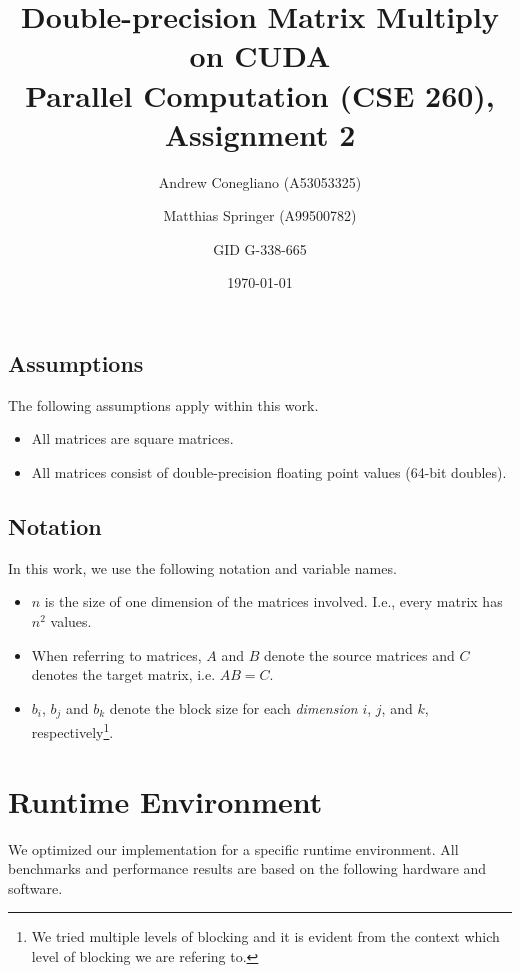 \documentclass[12pt]{article}
\begin{document}
\title{Double-precision Matrix Multiply on CUDA  \\ \vspace{2 mm} {\large Parallel Computation (CSE 260), Assignment 2}}
\date{\today}
\author{Andrew Conegliano (A53053325) \and Matthias Springer (A99500782) \and GID G-338-665}
\maketitle

\subsection{Assumptions}
The following assumptions apply within this work.

\begin{itemize}
	\item All matrices are square matrices.
	\item All matrices consist of double-precision floating point values (64-bit doubles).
\end{itemize}

\subsection{Notation}
In this work, we use the following notation and variable names.
\begin{itemize}
	\item $n$ is the size of one dimension of the matrices involved. I.e., every matrix has $n^2$ values.
	\item When referring to matrices, $A$ and $B$ denote the source matrices and $C$ denotes the target matrix, i.e. $AB = C$.
	\item $b_i$, $b_j$ and $b_k$ denote the block size for each \emph{dimension} $i$, $j$, and $k$, respectively\footnote{We tried multiple levels of blocking and it is evident from the context which level of blocking we are refering to.}.
\end{itemize}

\section*{Runtime Environment}
We optimized our implementation for a specific runtime environment. All benchmarks and performance results are based on the following hardware and software.
\end{document}
